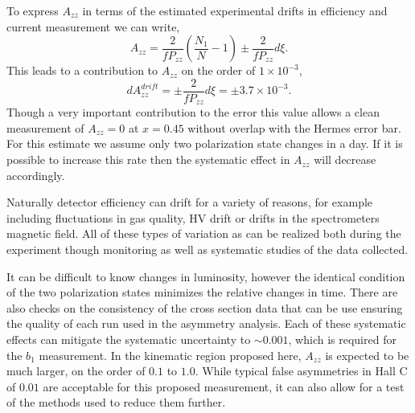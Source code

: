 To express $A_{zz}$ in terms of the estimated experimental drifts in efficiency and current measurement we can write,
\begin{equation}
A_{zz}=\frac{2}{fP_{zz}}\left(\frac{N_1}{N}-1\right)\pm\frac{2}{fP_{zz}}d\xi.
\end{equation}
This leads to a contribution to $A_{zz}$ on the order of $1\times10^{-3}$,
\begin{equation}
dA_{zz}^{drift}=\pm\frac{2}{fP_{zz}}d\xi=\pm3.7\times10^{-3}.
\end{equation}
Though a very important contribution to the error this value allows a clean measurement of $A_{zz}=0$ at $x=0.45$ without overlap with the Hermes error bar.
For this estimate we assume only two polarization state changes in a
day. 
If it is possible to increase this rate then the systematic effect in $A_{zz}$ will decrease accordingly.

Naturally detector efficiency can drift for a variety of reasons, for
example including fluctuations in gas quality, HV drift or
drifts in the spectrometers magnetic field.  All of these types of variation as can be realized both
during the experiment though monitoring as well as systematic studies of the data collected.

It can be difficult to know changes in luminosity, however the identical condition of the two polarization states minimizes the relative changes in time.
There are also checks on the consistency of the cross section data that can be use ensuring the quality of each run used in the asymmetry analysis.
Each of these systematic effects can mitigate the systematic uncertainty to $\sim0.001$, which is required for the $b_1$ measurement. In the kinematic region proposed here, $A_{zz}$ is expected to be much larger, on the order of $0.1$ to $1.0$. While typical false asymmetries in Hall C of $0.01$ are acceptable for this proposed measurement, it can also allow for a test of the methods used to reduce them further.